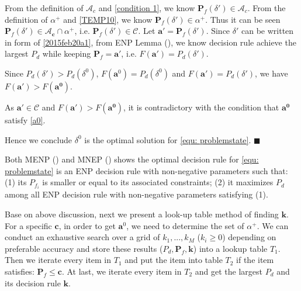 From the definition of $\mathcal{A}_c$ and \eqref{condition 1}, we know $\mathbf{P}_f(\delta') \in \mathcal{A}_c$. 
From the definition of $\alpha^+$ and \eqref{TEMP10}, we know $\mathbf{P}_f(\delta') \in \alpha^+$. 
Thus it can be seen $\mathbf{P}_f(\delta') \in \mathcal{A}_\mathbf{c} \cap \alpha^+$, i.e. $\mathbf{P}_f(\delta') \in \mathcal{C}$.  
Let $\mathbf{a}' = \mathbf{P}_f(\delta')$. 
Since $\delta'$ can be written in form of \eqref{2015feb20a1}, from ENP Lemma (), we know decision rule achieve the largest $P_d$ while keeping $\mathbf{P}_f = \mathbf{a}'$, i.e.  
$F(\mathbf{a}') = P_d(\delta')$. 

Since $P_d(\delta') > P_d(\delta^0)$, $F(\mathbf{a}^0) = P_d(\delta^0)$ and  $F(\mathbf{a}') = P_d(\delta')$, we have $F(\mathbf{a'}) > F(\mathbf{a^0})$. 

As $\mathbf{a}' \in \mathcal{C}$ and $F(\mathbf{a'}) > F(\mathbf{a^0})$, it is contradictory with the condition that $\mathbf{a^0}$ satisfy \eqref{a0}.

Hence we conclude $\delta^0$ is the optimal solution for \eqref{equ: problemstate}. $\blacksquare$

Both MENP () and MNEP () shows the optimal decision rule for \eqref{equ: problemstate} is an ENP decision rule  with non-negative parameters such that: (1) its $P_{f_i}$ is smaller or equal to its associated constraints; (2) it maximizes $P_d$ among all ENP decision rule with non-negative parameters satisfying (1).

Base on above discussion, 
next we present a look-up table method of finding $\mathbf{k}$. For a specific $\mathbf{c}$, in order to get $\mathbf{a}^0$, we need to determine the set of $\alpha^+$. We can conduct an exhaustive search over a grid of $k_1, ..., k_M$ ($k_i \geq 0$) depending on preferable accuracy and store these results ($P_d, \mathbf{P}_f, \mathbf{k}$) into a lookup table $T_1$. 
Then we iterate every item in $T_1$ and put the item into table $T_2$ if the item satisfies:  $\mathbf{P}_f \leq \mathbf{c}$.
At last, we iterate every item in $T_2$ and get the largest $P_d$ and its decision rule $\mathbf{k}$.

